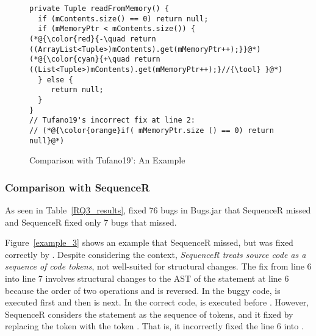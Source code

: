 \begin{figure}[t]
	\centering
	\begin{lstlisting}[]
private Tuple readFromMemory() {
  if (mContents.size() == 0) return null;
  if (mMemoryPtr < mContents.size()) {
(*@{\color{red}{-\quad return ((ArrayList<Tuple>)mContents).get(mMemoryPtr++);}}@*)
(*@{\color{cyan}{+\quad return ((List<Tuple>)mContents).get(mMemoryPtr++);}//{\tool} }@*)
  } else {
     return null;
  }
}
// Tufano19's incorrect fix at line 2:
// (*@{\color{orange}if( mMemoryPtr.size () == 0) return null}@*) 
	\end{lstlisting}
        \vspace{-15pt}
	\caption{Comparison with Tufano19': An Example}
	\label{example_tufano19}
\end{figure}

\subsubsection{\bf Comparison with SequenceR}

As seen in Table~\ref{RQ3_results}, {\tool} fixed 76 bugs in Bugs.jar
that SequenceR missed and SequenceR fixed only 7 bugs that
{\tool} missed.

Figure~\ref{example_3} shows an example that SequenceR missed, but was
fixed correctly by {\tool}. Despite considering the context, {\em
  SequenceR treats source code as a sequence of code tokens}, not
well-suited for structural changes. The fix from line 6 into line 7
involves structural changes to the AST of the statement at line 6
because the order of two operations  and \code{\%} is
reversed. In the buggy code,  is executed first and then
\code{\%} is next. In the correct code, \code{\%} is executed before
.
However, SequenceR considers the statement as the sequence of tokens,
and it fixed by replacing the token  with the token
. That is, it incorrectly fixed the line 6 into
   
\code{\%} .

